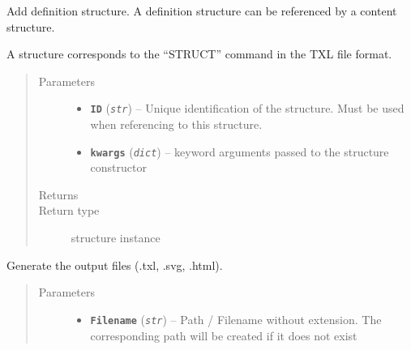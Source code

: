 \documentclass[letterpaper,10pt,english]{sphinxmanual}
\begin{document}
\begin{fulllineitems}
\begin{fulllineitems}
\label{Chapters/PythonModuleReference/TXLWriter/TXLWizard.TXLWriter:TXLWizard.TXLWriter.TXLWriter.AddDefinitionStructure}
Add definition structure. A definition structure can be referenced by a content structure.

A structure corresponds to the ``STRUCT'' command in the TXL file format.
\begin{quote}\begin{description}
\item[{Parameters}] \leavevmode\begin{itemize}
\item {} 
\textbf{\texttt{ID}} (\emph{\texttt{str}}) -- Unique identification of the structure. Must be used when referencing to this structure.

\item {} 
\textbf{\texttt{kwargs}} (\emph{\texttt{dict}}) -- keyword arguments passed to the structure constructor

\end{itemize}

\item[{Returns}] \leavevmode


\item[{Return type}] \leavevmode
{\hyperref[Chapters/PythonModuleReference/Patterns/TXLWizard.Patterns.Structure:TXLWizard.Patterns.Structure.Structure]{}} structure instance

\end{description}\end{quote}

\end{fulllineitems}


\begin{fulllineitems}
\label{Chapters/PythonModuleReference/TXLWriter/TXLWizard.TXLWriter:TXLWizard.TXLWriter.TXLWriter.GenerateFiles}
Generate the output files (.txl, .svg, .html).
\begin{quote}\begin{description}
\item[{Parameters}] \leavevmode\begin{itemize}
\item {} 
\textbf{\texttt{Filename}} (\emph{\texttt{str}}) -- Path / Filename without extension.
The corresponding path will be created if it does not exist


\end{itemize}
\end{description}
\end{quote}
\end{fulllineitems}
\end{fulllineitems}
\end{document}
